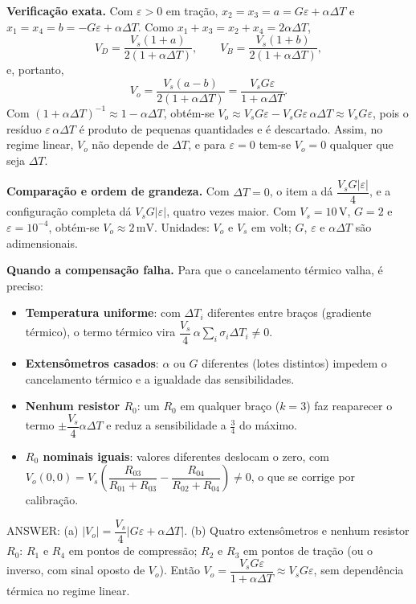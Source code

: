 \documentclass{article}%
\begin{document}
\textbf{Verificação exata.} Com $\varepsilon>0$ em tração, $x_2=x_3=a=G\varepsilon+\alpha\Delta T$ e $x_1=x_4=b=-G\varepsilon+\alpha\Delta T$. Como $x_1+x_3=x_2+x_4=2\alpha\Delta T$,
\[
V_D=\frac{V_s(1+a)}{2(1+\alpha\Delta T)},\qquad V_B=\frac{V_s(1+b)}{2(1+\alpha\Delta T)},
\]
e, portanto,
\[
V_o=\frac{V_s(a-b)}{2(1+\alpha\Delta T)}=\frac{V_sG\varepsilon}{1+\alpha\Delta T}.
\]
Com $(1+\alpha\Delta T)^{-1}\approx 1-\alpha\Delta T$, obtém-se $V_o\approx V_sG\varepsilon-V_sG\varepsilon\,\alpha\Delta T\approx V_sG\varepsilon$, pois o resíduo $\varepsilon\,\alpha\Delta T$ é produto de pequenas quantidades e é descartado. Assim, no regime linear, $V_o$ não depende de $\Delta T$, e para $\varepsilon=0$ tem-se $V_o=0$ qualquer que seja $\Delta T$.

\textbf{Comparação e ordem de grandeza.} Com $\Delta T=0$, o item a dá $\dfrac{V_sG|\varepsilon|}{4}$, e a configuração completa dá $V_sG|\varepsilon|$, quatro vezes maior. Com $V_s=10\,\mathrm{V}$, $G=2$ e $\varepsilon=10^{-4}$, obtém-se $V_o\approx 2\,\mathrm{mV}$. Unidades: $V_o$ e $V_s$ em volt; $G$, $\varepsilon$ e $\alpha\Delta T$ são adimensionais.

\textbf{Quando a compensação falha.} Para que o cancelamento térmico valha, é preciso:
\begin{itemize}
\item \textbf{Temperatura uniforme}: com $\Delta T_i$ diferentes entre braços (gradiente térmico), o termo térmico vira $\dfrac{V_s}{4}\,\alpha\sum_i\sigma_i\Delta T_i\neq0$.
\item \textbf{Extensômetros casados}: $\alpha$ ou $G$ diferentes (lotes distintos) impedem o cancelamento térmico e a igualdade das sensibilidades.
\item \textbf{Nenhum resistor $R_0$}: um $R_0$ em qualquer braço ($k=3$) faz reaparecer o termo $\pm\dfrac{V_s}{4}\alpha\Delta T$ e reduz a sensibilidade a $\frac{3}{4}$ do máximo.
\item \textbf{$R_0$ nominais iguais}: valores diferentes deslocam o zero, com $V_o(0,0)=V_s\left(\dfrac{R_{03}}{R_{01}+R_{03}}-\dfrac{R_{04}}{R_{02}+R_{04}}\right)\neq0$, o que se corrige por calibração.
\end{itemize}

ANSWER: (a) $|V_o|=\dfrac{V_s}{4}\left|G\varepsilon+\alpha\Delta T\right|$. (b) Quatro extensômetros e nenhum resistor $R_0$: $R_1$ e $R_4$ em pontos de compressão; $R_2$ e $R_3$ em pontos de tração (ou o inverso, com sinal oposto de $V_o$). Então $V_o=\dfrac{V_sG\varepsilon}{1+\alpha\Delta T}\approx V_sG\varepsilon$, sem dependência térmica no regime linear.%
\newpage%
\end{document}
